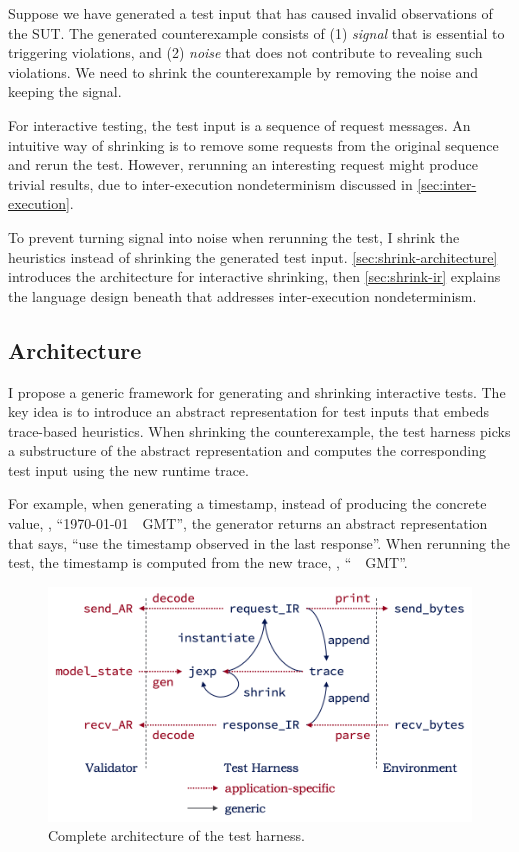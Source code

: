 Suppose we have generated a test input that has caused invalid observations of
the SUT.  The generated counterexample consists of (1) {\em signal} that is
essential to triggering violations, and (2) {\em noise} that does not contribute
to revealing such violations.  We need to shrink the counterexample by removing
the noise and keeping the signal.

For interactive testing, the test input is a sequence of request messages.  An
intuitive way of shrinking is to remove some requests from the original sequence
and rerun the test.  However, rerunning an interesting request might produce
trivial results, due to inter-execution nondeterminism discussed in
\autoref{sec:inter-execution}.

To prevent turning signal into noise when rerunning the test, I shrink the
heuristics instead of shrinking the generated test input.
\autoref{sec:shrink-architecture} introduces the architecture for interactive
shrinking, then \autoref{sec:shrink-ir} explains the language design beneath
that addresses inter-execution nondeterminism.

\subsection{Architecture}
\label{sec:shrink-architecture}

I propose a generic framework for generating and shrinking interactive tests.
The key idea is to introduce an abstract representation for test inputs that
embeds trace-based heuristics.  When shrinking the counterexample, the test
harness picks a substructure of the abstract representation and computes the
corresponding test input using the new runtime trace.

For example, when generating a timestamp, instead of producing the concrete
value, \eg, ``\httpdate\today~\currenttime~GMT'', the generator returns an
abstract representation that says, ``use the timestamp observed in the last
response''.  When rerunning the test, the timestamp is computed from the new
trace, \eg, ``\httpdate\DayAfter~\currenttime~GMT''.

\begin{figure}
  \includegraphics[width=.8\textwidth]{figures/shrink}
  \caption{Complete architecture of the test harness.}
  \label{fig:shrink}
\end{figure}

